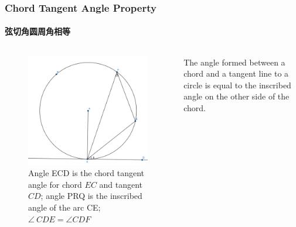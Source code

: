 \documentclass[
	11pt, %
]{beamer}
\begin{document}
\begin{frame}
\frametitle{Chord Tangent Angle Property}
\framesubtitle{弦切角圆周角相等}

\begin{columns}[t] 
		\begin{column}{0.4\textwidth} %
			\begin{figure}
				\includegraphics[width=\linewidth]{Chord_Tangent_Angle.png}
				\caption{Angle ECD is the chord tangent angle for chord $EC$ and tangent $CD$; angle PRQ is the inscribed angle of the arc CE;$\angle\ CDE=  \angle CDF$}
			\end{figure}
		\end{column}
		\begin{column}{0.6\textwidth} %

		\begin{theorem}[弦切角定理]
			The angle formed between a chord and a tangent line to a circle is equal to the inscribed angle on the other side of the chord.
		\end{theorem}
		\end{column}
	\end{columns}
\end{frame}

\end{document}
